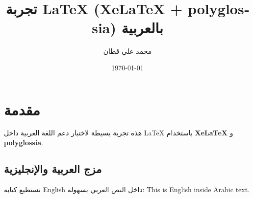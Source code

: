 \documentclass[12pt]{article}
\begin{document}
\title{تجربة \LaTeX{} \textenglish{(XeLaTeX + polyglossia)} بالعربية}
\author{محمد علي قطان}
\date{\today}
\maketitle

\section{مقدمة}
هذه تجربة بسيطة لاختبار دعم اللغة العربية داخل \LaTeX{} باستخدام \textenglish{\textbf{XeLaTeX}} و \textenglish{\textbf{polyglossia}}.

\subsection{مزج العربية والإنجليزية}
نستطيع كتابة English داخل النص العربي بسهولة: \textenglish{This is English inside Arabic text}.
\end{document}
